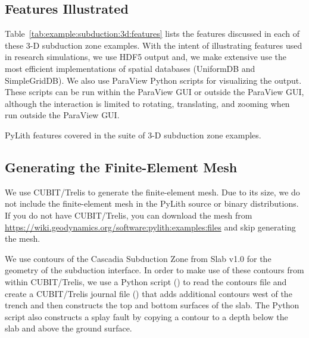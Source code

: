 \subsection{Features Illustrated}

Table~\ref{tab:example:subduction:3d:features} lists the features
discussed in each of these 3-D subduction zone examples. With the
intent of illustrating features used in research simulations, we use
HDF5 output and, we make extensive use the most efficient
implementations of spatial databases (UniformDB and SimpleGridDB). We
also use ParaView Python scripts for visualizing the output. These
scripts can be run within the ParaView GUI or outside the ParaView
GUI, although the interaction is limited to rotating, translating, and
zooming when run outside the ParaView GUI.

\begin{table}[htbp]
  \caption{PyLith features covered in the suite of 3-D subduction zone examples.}
  \label{tab:example:subduction:3d:features}
  
\end{table}

\subsection{Generating the Finite-Element Mesh}

We use CUBIT/Trelis to generate the finite-element mesh. Due to its
size, we do not include the finite-element mesh in the PyLith source
or binary distributions. If you do not have CUBIT/Trelis, you can
download the mesh from
\url{https://wiki.geodynamics.org/software:pylith:examples:files} and
skip generating the mesh.

We use contours of the Cascadia Subduction Zone from Slab v1.0
\cite{Hayes:etal:2012} for the geometry of the subduction interface. In
order to make use of these contours from within CUBIT/Trelis, we use a
Python script () to read the contours
file and create a CUBIT/Trelis journal file
() that adds additional contours west of
the trench and then constructs the top and bottom surfaces of the
slab. The Python script also constructs a splay fault by copying a
contour to a depth below the slab and above the ground surface.


